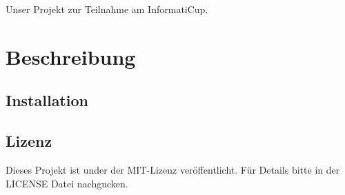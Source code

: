 Unser Projekt zur Teilnahme am Informati\-Cup.
\section{Beschreibung}

\subsection{Installation}

\subsection{Lizenz }

Dieses Projekt ist under der M\-I\-T-\/\-Lizenz veröffentlicht. Für Details bitte in der L\-I\-C\-E\-N\-S\-E Datei nachgucken.
